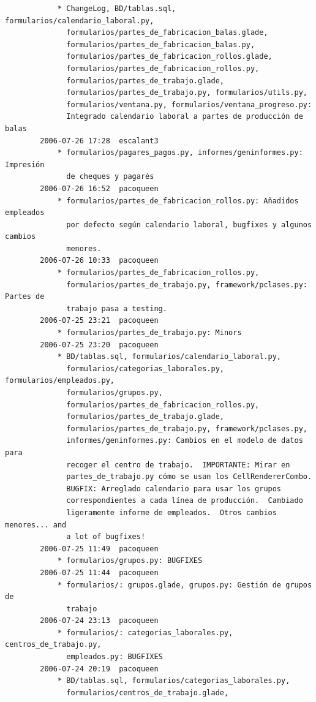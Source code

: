\documentclass[a4paper]{article}
\begin{document}
\begin{verbatim}
            * ChangeLog, BD/tablas.sql, formularios/calendario_laboral.py,
              formularios/partes_de_fabricacion_balas.glade,
              formularios/partes_de_fabricacion_balas.py,
              formularios/partes_de_fabricacion_rollos.glade,
              formularios/partes_de_fabricacion_rollos.py,
              formularios/partes_de_trabajo.glade,
              formularios/partes_de_trabajo.py, formularios/utils.py,
              formularios/ventana.py, formularios/ventana_progreso.py:
              Integrado calendario laboral a partes de producción de balas
        2006-07-26 17:28  escalant3
            * formularios/pagares_pagos.py, informes/geninformes.py: Impresión
              de cheques y pagarés
        2006-07-26 16:52  pacoqueen
            * formularios/partes_de_fabricacion_rollos.py: Añadidos empleados
              por defecto según calendario laboral, bugfixes y algunos cambios
              menores.
        2006-07-26 10:33  pacoqueen
            * formularios/partes_de_fabricacion_rollos.py,
              formularios/partes_de_trabajo.py, framework/pclases.py: Partes de
              trabajo pasa a testing.
        2006-07-25 23:21  pacoqueen
            * formularios/partes_de_trabajo.py: Minors
        2006-07-25 23:20  pacoqueen
            * BD/tablas.sql, formularios/calendario_laboral.py,
              formularios/categorias_laborales.py, formularios/empleados.py,
              formularios/grupos.py,
              formularios/partes_de_fabricacion_rollos.py,
              formularios/partes_de_trabajo.glade,
              formularios/partes_de_trabajo.py, framework/pclases.py,
              informes/geninformes.py: Cambios en el modelo de datos para
              recoger el centro de trabajo.  IMPORTANTE: Mirar en
              partes_de_trabajo.py cómo se usan los CellRendererCombo.
              BUGFIX: Arreglado calendario para usar los grupos
              correspondientes a cada línea de producción.  Cambiado
              ligeramente informe de empleados.  Otros cambios menores... and
              a lot of bugfixes!
        2006-07-25 11:49  pacoqueen
            * formularios/grupos.py: BUGFIXES
        2006-07-25 11:44  pacoqueen
            * formularios/: grupos.glade, grupos.py: Gestión de grupos de
              trabajo
        2006-07-24 23:13  pacoqueen
            * formularios/: categorias_laborales.py, centros_de_trabajo.py,
              empleados.py: BUGFIXES
        2006-07-24 20:19  pacoqueen
            * BD/tablas.sql, formularios/categorias_laborales.py,
              formularios/centros_de_trabajo.glade,

\end{verbatim}
\end{document}
